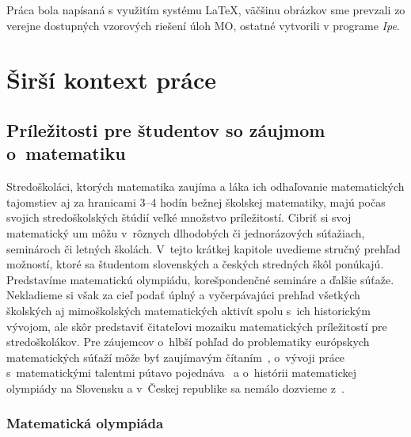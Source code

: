Práca bola napísaná s využitím systému \LaTeX, väčšinu obrázkov sme prevzali zo verejne dostupných vzorových riešení úloh MO, ostatné vytvorili v programe \textit{Ipe}.


\cleardoublepage

\renewcommand{\chaptermark}[1]{\markboth{\thechapter. #1}{}}
\renewcommand{\sectionmark}[1]{\markright{\thesection. #1}{}}
\HlavickaKapitoly
\chapter{Širší kontext práce}
\section{Príležitosti pre študentov so záujmom o~matematiku}

Stredoškoláci, ktorých matematika zaujíma a láka ich odhaľovanie matematických tajomstiev aj za hranicami 3--4 hodín bežnej školskej matematiky, majú počas svojich stredoškolských štúdií veľké množstvo príležitostí. Cibriť si svoj matematický um môžu v~rôznych dlhodobých či jednorázových súťažiach, seminároch či letných školách. V~tejto krátkej kapitole uvedieme stručný prehľad možností, ktoré sa študentom slovenských a českých stredných škôl ponúkajú. Predstavíme matematickú olympiádu, korešpondenčné semináre a ďalšie súťaže. Nekladieme si však za cieľ podať úplný a vyčerpávajúci prehľad všetkých školských aj mimoškolských matematických aktivít spolu s~ich historickým vývojom, ale skôr predstaviť čitateľovi mozaiku matematických príležitostí pre stredoškolákov. Pre záujemcov o~hlbší pohľad do problematiky európskych matematických súťaží môže byť zaujímavým čítaním~\cite{huv},  o~vývoji práce s~matematickými talentmi pútavo pojednáva~\cite{svrcek2014} a o~histórii matematickej olympiády na Slovensku a v~Českej republike sa nemálo dozvieme z~\cite{dos}.


\subsection*{Matematická olympiáda}

